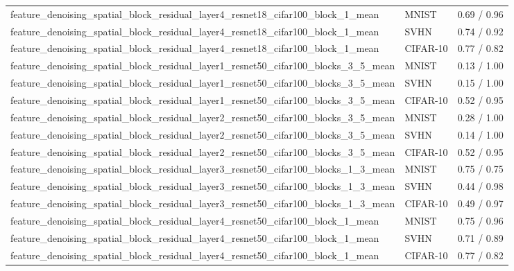 \begin{tabular}{lll}
feature\_denoising\_spatial\_block\_residual\_layer4\_resnet18\_cifar100\_block\_1\_mean & MNIST & 0.69 / 0.96 \\
feature\_denoising\_spatial\_block\_residual\_layer4\_resnet18\_cifar100\_block\_1\_mean & SVHN & 0.74 / 0.92 \\
feature\_denoising\_spatial\_block\_residual\_layer4\_resnet18\_cifar100\_block\_1\_mean & CIFAR-10 & 0.77 / 0.82 \\
feature\_denoising\_spatial\_block\_residual\_layer1\_resnet50\_cifar100\_blocks\_3\_5\_mean & MNIST & 0.13 / 1.00 \\
feature\_denoising\_spatial\_block\_residual\_layer1\_resnet50\_cifar100\_blocks\_3\_5\_mean & SVHN & 0.15 / 1.00 \\
feature\_denoising\_spatial\_block\_residual\_layer1\_resnet50\_cifar100\_blocks\_3\_5\_mean & CIFAR-10 & 0.52 / 0.95 \\
feature\_denoising\_spatial\_block\_residual\_layer2\_resnet50\_cifar100\_blocks\_3\_5\_mean & MNIST & 0.28 / 1.00 \\
feature\_denoising\_spatial\_block\_residual\_layer2\_resnet50\_cifar100\_blocks\_3\_5\_mean & SVHN & 0.14 / 1.00 \\
feature\_denoising\_spatial\_block\_residual\_layer2\_resnet50\_cifar100\_blocks\_3\_5\_mean & CIFAR-10 & 0.52 / 0.95 \\
feature\_denoising\_spatial\_block\_residual\_layer3\_resnet50\_cifar100\_blocks\_1\_3\_mean & MNIST & 0.75 / 0.75 \\
feature\_denoising\_spatial\_block\_residual\_layer3\_resnet50\_cifar100\_blocks\_1\_3\_mean & SVHN & 0.44 / 0.98 \\
feature\_denoising\_spatial\_block\_residual\_layer3\_resnet50\_cifar100\_blocks\_1\_3\_mean & CIFAR-10 & 0.49 / 0.97 \\
feature\_denoising\_spatial\_block\_residual\_layer4\_resnet50\_cifar100\_block\_1\_mean & MNIST & 0.75 / 0.96 \\
feature\_denoising\_spatial\_block\_residual\_layer4\_resnet50\_cifar100\_block\_1\_mean & SVHN & 0.71 / 0.89 \\
feature\_denoising\_spatial\_block\_residual\_layer4\_resnet50\_cifar100\_block\_1\_mean & CIFAR-10 & 0.77 / 0.82 \\
\bottomrule
\end{tabular}
